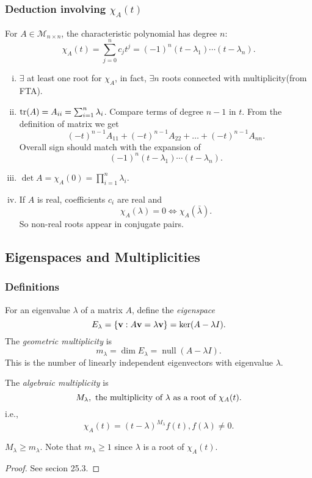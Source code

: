 \documentclass[10pt]{article}
\def\ge{\geqslant}
\DeclareMathOperator{\nullity}{null}
\begin{document}
    \subsubsection{Deduction involving $ \chi_A(t) $}
    For $ A\in \mathcal{M}_{n\times n} $, the characteristic polynomial has degree $n$:
    \[
        \chi_A(t)=\sum_{j=0}^{n}c_jt^j=(-1)^n(t-\lambda_1)\cdots(t-\lambda_n)
    .\]
    \begin{enumerate}[(i)]
        \item $ \exists  $ at least one root for $ \chi_A $, in fact, $ \exists n$ roots connected with multiplicity(from FTA).
        \item $ \tr(A)=A_{ii}=\sum_{i=1}^{n}\lambda_i $. Compare terms of degree $n-1$ in $t$. From the definition of matrix we get 
        \[
            (-t)^{n-1} A_{11}+(-t)^{n-1} A_{22}+\ldots+(-t)^{n-1} A_{n n}
        .\]
        Overall sign should match with the expansion of 
        \[
            (-1)^n(t-\lambda_1)\cdots(t-\lambda_n)
        .\]
        \item $ \det A = \chi_A(0)=\prod_{i=1}^{n}\lambda_i $.
        \item If $A$ is real, coefficients $c_i$ are real and 
        \[
            \chi_A(\lambda)=0 \Longleftrightarrow \chi_A(\bar{\lambda})
        .\]
        So non-real roots appear in conjugate pairs.
    \end{enumerate}
    \subsection{Eigenspaces and Multiplicities}
    \subsubsection{Definitions}
    \begin{definition}
        For an eigenvalue $ \lambda $ of a matrix $A$, define the \textit{eigenspace}
        \[
            E_\lambda=\left\{ {\bf v}:A{\bf v}=\lambda{\bf v} \right\}=\ker (A-\lambda I) 
        .\]
        The \textit{geometric multiplicity} is 
        \[
            m_\lambda=\dim E_\lambda=\nullity(A-\lambda I)
        .\]
        This is the number of linearly independent eigenvectors with eigenvalue $ \lambda $.

        The \textit{algebraic multiplicity} is
        \[
            M_\lambda, \text{ the multiplicity of $\lambda$ as a root of $ \chi_A(t) $}
        .\]
        i.e.,
        \[
            \chi_A(t)=(t-\lambda)^{M_\lambda}f(t), f(\lambda)\neq 0
        .\]
    \end{definition}
    \begin{proposition}
        $ M_\lambda\ge m_\lambda $. Note that $ m_\lambda\ge 1 $ since $ \lambda $ is a root of $ \chi_A(t) $.
    \end{proposition}
    \begin{proof}
        See secion 25.3.
    \end{proof}
\end{document}
